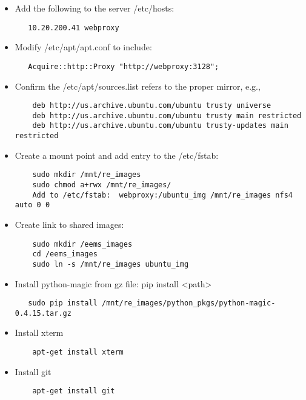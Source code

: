 \documentclass[titlepage]{article}
\begin{document}
\begin{itemize}
\item Add the following to the server /etc/hosts:
\begin{verbatim}
   10.20.200.41 webproxy
\end{verbatim}

\item Modify /etc/apt/apt.conf to include:
\begin{verbatim}
   Acquire::http::Proxy "http://webproxy:3128";
\end{verbatim}

\item Confirm the /etc/apt/sources.list refers to the proper mirror, e.g., 
\begin{verbatim}
    deb http://us.archive.ubuntu.com/ubuntu trusty universe
    deb http://us.archive.ubuntu.com/ubuntu trusty main restricted
    deb http://us.archive.ubuntu.com/ubuntu trusty-updates main restricted
\end{verbatim}


\item Create a mount point and add entry to the /etc/fstab:
\begin{verbatim}
    sudo mkdir /mnt/re_images
    sudo chmod a+rwx /mnt/re_images/
    Add to /etc/fstab:  webproxy:/ubuntu_img /mnt/re_images nfs4 auto 0 0
\end{verbatim}

\item Create link to shared images:
\begin{verbatim}
    sudo mkdir /eems_images
    cd /eems_images
    sudo ln -s /mnt/re_images ubuntu_img
\end{verbatim}


\item Install python-magic from gz file:  pip install <path>
\begin{verbatim}
   sudo pip install /mnt/re_images/python_pkgs/python-magic-0.4.15.tar.gz
\end{verbatim}

\item Install xterm
\begin{verbatim}
    apt-get install xterm
\end{verbatim}

\item Install git
\begin{verbatim}
    apt-get install git
\end{verbatim}
\end{itemize}
\end{document}
